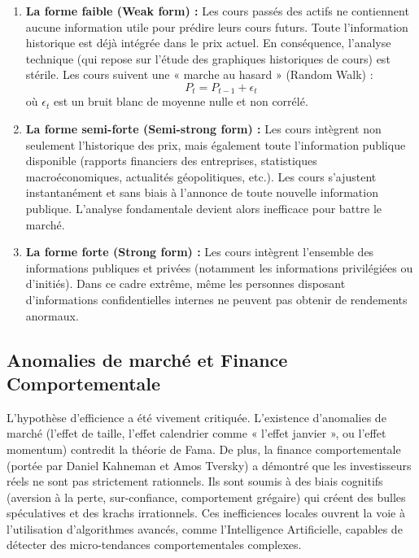 \begin{enumerate}
    \item \textbf{La forme faible (Weak form) :} Les cours passés des actifs ne contiennent aucune information utile pour prédire leurs cours futurs. Toute l'information historique est déjà intégrée dans le prix actuel. En conséquence, l'analyse technique (qui repose sur l'étude des graphiques historiques de cours) est stérile. Les cours suivent une « marche au hasard » (Random Walk) :
    \begin{equation}
        P_t = P_{t-1} + \epsilon_t
    \end{equation}
    où $\epsilon_t$ est un bruit blanc de moyenne nulle et non corrélé.
    \item \textbf{La forme semi-forte (Semi-strong form) :} Les cours intègrent non seulement l'historique des prix, mais également toute l'information publique disponible (rapports financiers des entreprises, statistiques macroéconomiques, actualités géopolitiques, etc.). Les cours s'ajustent instantanément et sans biais à l'annonce de toute nouvelle information publique. L'analyse fondamentale devient alors inefficace pour battre le marché.
    \item \textbf{La forme forte (Strong form) :} Les cours intègrent l'ensemble des informations publiques et privées (notamment les informations privilégiées ou d'initiés). Dans ce cadre extrême, même les personnes disposant d'informations confidentielles internes ne peuvent pas obtenir de rendements anormaux.
\end{enumerate}

\subsection{Anomalies de marché et Finance Comportementale}
L'hypothèse d'efficience a été vivement critiquée. L'existence d'anomalies de marché (l'effet de taille, l'effet calendrier comme « l'effet janvier », ou l'effet momentum) contredit la théorie de Fama. De plus, la finance comportementale (portée par Daniel Kahneman et Amos Tversky) a démontré que les investisseurs réels ne sont pas strictement rationnels. Ils sont soumis à des biais cognitifs (aversion à la perte, sur-confiance, comportement grégaire) qui créent des bulles spéculatives et des krachs irrationnels. Ces inefficiences locales ouvrent la voie à l'utilisation d'algorithmes avancés, comme l'Intelligence Artificielle, capables de détecter des micro-tendances comportementales complexes.

